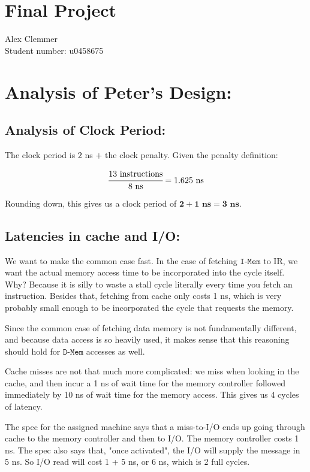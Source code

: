 \documentclass[a4paper]{article}
\begin{document}
\section*{Final Project}
Alex Clemmer\\
Student number: u0458675

\section{Analysis of Peter's Design:}

\subsection{Analysis of Clock Period:}

The clock period is $2$ ns $ + $ the clock penalty. Given the penalty definition:

\begin{equation}
\cfrac{13 \text{ instructions}}{8 \text{ ns}} = 1.625 \text{ ns}
\end{equation}

Rounding down, this gives us a clock period of $\mathbf{2 + 1 \text{ ns} = 3 \text{ ns}}$.

\subsection{Latencies in cache and I/O:}

We want to make the common case fast. In the case of fetching $\texttt{I-Mem}$ to IR, we want the actual memory access time to be incorporated into the cycle itself. Why? Because it is silly to waste a stall cycle literally every time you fetch an instruction. Besides that, fetching from cache only costs 1 ns, which is very probably small enough to be incorporated the cycle that requests the memory.

Since the common case of fetching data memory is not fundamentally different, and because data access is so heavily used, it makes sense that this reasoning should hold for $\texttt{D-Mem}$ accesses as well.

Cache misses are not that much more complicated: we miss when looking in the cache, and then incur a 1 ns of wait time for the memory controller followed immediately by 10 ns of wait time for the memory access. This gives us 4 cycles of latency.

The spec for the assigned machine says that a miss-to-I/O ends up going through cache to the memory controller and then to I/O. The memory controller costs 1 ns. The spec also says that, "once activated", the I/O will supply the message in 5 ns. So I/O read will cost 1 + 5 ns, or 6 ns, which is 2 full cycles.
\end{document}
